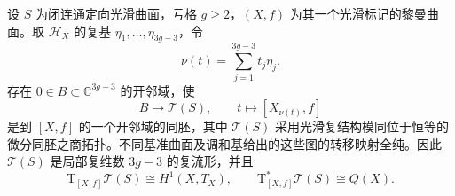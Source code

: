 \begin{theorem}\label{g4:thm:0603:local-parameters}
	设 \(S\) 为闭连通定向光滑曲面，亏格 \(g\ge2\)，\((X,f)\) 为其一个光滑标记的黎曼曲面。取 \(\mathscr H_X\) 的复基 \(\eta_1,\ldots,\eta_{3g-3}\)，令
	\[
		\nu(t)=\sum_{j=1}^{3g-3}t_j\eta_j.
	\]
	存在 \(0\in B\subset\mathbb C^{3g-3}\) 的开邻域，使
	\begin{equation}\label{g4:eq:0603:teich-chart}
		B\longrightarrow\mathcal T(S),\qquad
		t\longmapsto[X_{\nu(t)},f]
	\end{equation}
	是到 \([X,f]\) 的一个开邻域的同胚，其中 \(\mathcal T(S)\) 采用光滑复结构模同位于恒等的微分同胚之商拓扑。不同基准曲面及调和基给出的这些图的转移映射全纯。因此 \(\mathcal T(S)\) 是局部复维数 \(3g-3\) 的复流形，并且
	\[
		\mathrm T_{[X,f]}\mathcal T(S)\cong H^1(X,T_X),
		\qquad
		\mathrm T^*_{[X,f]}\mathcal T(S)\cong Q(X).
	\]
\end{theorem}
